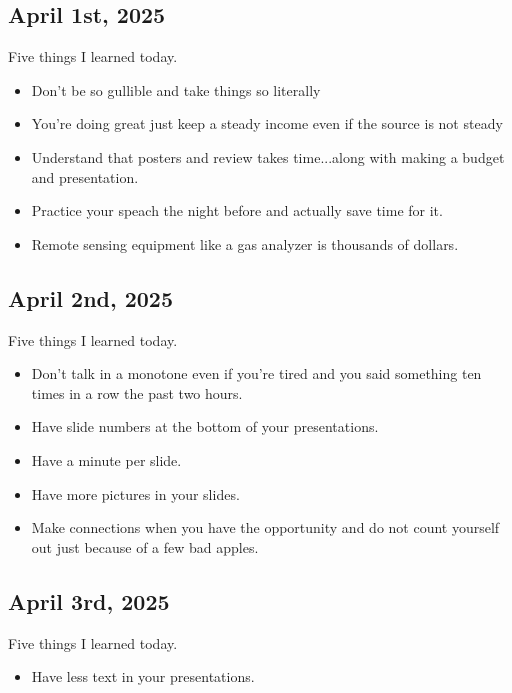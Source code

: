 \documentclass{article}
\begin{document}
\subsection{April 1st, 2025}

Five things I learned today. 

\begin{itemize}
    \item Don't be so gullible and take things so literally 
    \item You're doing great just keep a steady income even if the source is not steady
    \item Understand that posters and review takes time...along with making a budget and presentation. 
    \item Practice your speach the night before and actually save time for it. 
    \item Remote sensing equipment like a gas analyzer is thousands of dollars.
\end{itemize}


\subsection{April 2nd, 2025}
Five things I learned today. 
\begin{itemize}
    \item Don't talk in a monotone even if you're tired and you said something ten times in a row the past two hours. 
    \item Have slide numbers at the bottom of your presentations. 
    \item Have a minute per slide. 
    \item Have more pictures in your slides. 
    \item Make connections when you have the opportunity and do not count yourself out just because of a few bad apples. 
\end{itemize}

\subsection{April 3rd, 2025}

Five things I learned today. 
\begin{itemize}
    \item Have less text in your presentations. 
\end{itemize}
\end{document}
